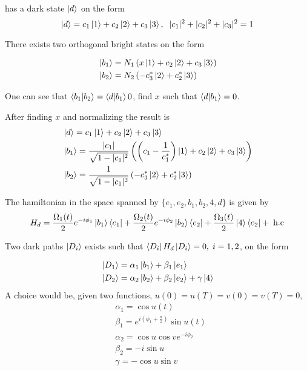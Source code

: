 has a dark state $\ket{d}$ on the form 
\begin{equation}
\ket{d} = c_1\ket{1} + c_2\ket{2} + c_3\ket{3},\;\; |c_1|^2 + |c_2|^2 + |c_3|^2 = 1
\end{equation}

There exists two orthogonal bright states on the form 

\begin{equation}
\begin{aligned} &
\ket{b_1} = N_1 \left(x\ket{1} + c_2\ket{2} + c_3\ket{3} \right)
\\ &
\ket{b_2} = N_2 \left(-c_3^{*}\ket{2} + c_2^{*}\ket{3} \right)
\end{aligned}
\end{equation}

One can see that
$\bra{b_1}\ket{b_2} = \bra{d}\ket{b_1} 0$, find $x$ such that $\bra{d}\ket{b_1} = 0$.

After finding $x$ and normalizing the result is 
\begin{equation}
\begin{aligned}&
\ket{d} = c_1\ket{1} + c_2\ket{2} + c_3\ket{3}
\\ &
\ket{b_1} = \frac{|c_1|}{\sqrt{1-|c_1|^2}} \left(\left(c_1 - \frac{1}{c_1^{*}}\right)\ket{1} + c_2\ket{2} + c_3\ket{3} \right)
\\ &
\ket{b_2} =  \frac{1}{\sqrt{1-|c_1|^2}} \left(-c_3^{*}\ket{2} + c_2^{*}\ket{3} \right)
\end{aligned}
\end{equation}

The hamiltonian in the space spanned by $\{e_1, e_2, b_1, b_2, 4, d\}$ is given by 
\begin{equation}
H_d = \frac{\Omega_1(t)}{2}e^{-i\phi_1} \ket{b_1}\bra{e_1} + \frac{\Omega_2(t)}{2}e^{-i\phi_2} \ket{b_2}\bra{e_2} + \frac{\Omega_3(t)}{2}\ket{4}\bra{e_2} + \; \text{h.c}
\end{equation}

Two dark paths $\ket{D_i}$ exists such that  $\bra{D_i}H_d\ket{D_i} = 0, \; i=1,2$, on the form

\begin{equation}
\begin{aligned}&
\ket{D_1} = \alpha_1\ket{b_1} + \beta_1\ket{e_1}
\\&
\ket{D_2} = \alpha_2\ket{b_2} + \beta_2\ket{e_2} + \gamma\ket{4}
\end{aligned}
\end{equation}
A choice would be, given two functions, $u(0) = u(T) = v(0) = v(T) = 0$,
\begin{equation}
\begin{aligned}&
\alpha_1 = \cos u(t)
\\&
\beta_1 = e^{i(\phi_1 + \frac{\pi}{2})}\sin u(t)
\\&
\alpha_2 = \cos u \cos v e^{-i\phi_2}
\\&
\beta_2 = -i\sin u
\\&
\gamma = -\cos u\sin v
\end{aligned}
\end{equation}


